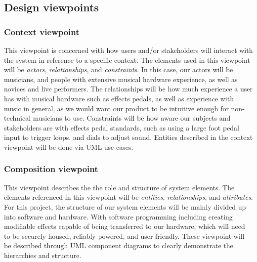 \subsection{Design viewpoints}
    
    \subsubsection{Context viewpoint}
        \label{desc:context}
        This viewpoint is concerned with how users and/or stakeholders will interact with the system in reference to a specific context. The elements used in this viewpoint will be \textit{actors}, \textit{relationships}, and \textit{constraints}.
        In this case, our actors will be musicians, and people with extensive musical hardware experience, as well as novices and live performers. The relationships will be how much experience a user has with musical hardware such as effects pedals, as well as experience with music in general, as we would want our product to be intuitive enough for non-technical musicians to use. Constraints will be how aware our subjects and stakeholders are with effects pedal standards, such as using a large foot pedal input to trigger loops, and dials to adjust sound. 
        Entities described in the context viewpoint will be done via UML use cases.\cite{bib:ieeestd}
    
    \subsubsection{Composition viewpoint}
        This viewpoint describes the the role and structure of system elements. The elements referenced in this viewpoint will be \textit{entities}, \textit{relationships}, and \textit{attributes}. For this project, the structure of our system elements will be mainly divided up into software and hardware. With software programming including creating modifiable effects capable of being transferred to our hardware, which will need to be securely housed, reliably powered, and user friendly. 
        These viewpoint will be described through UML component diagrams to clearly demonstrate the hierarchies and structure.
        
        
